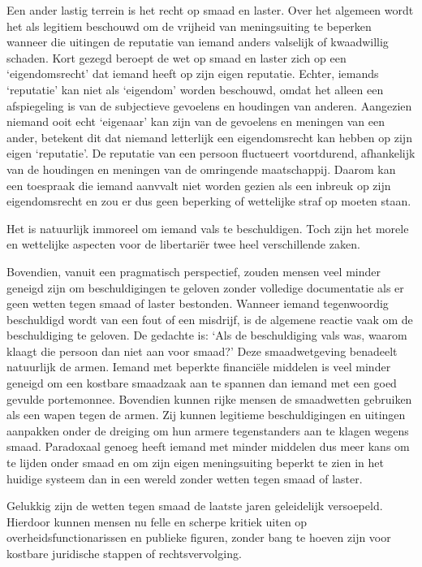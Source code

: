 \documentclass[
  a5paper,
  smalldemyvopaper,10pt,twoside,onecolumn,openright,extrafontsizes,hidelinks]{memoir}
\begin{document}
Een ander lastig terrein is het recht op smaad en laster. Over het
algemeen wordt het als legitiem beschouwd om de vrijheid van
meningsuiting te beperken wanneer die uitingen de reputatie van iemand
anders valselijk of kwaadwillig schaden. Kort gezegd beroept de wet op
smaad en laster zich op een `eigendomsrecht' dat iemand heeft op zijn
eigen reputatie. Echter, iemands `reputatie' kan niet als `eigendom'
worden beschouwd, omdat het alleen een afspiegeling is van de
subjectieve gevoelens en houdingen van anderen. Aangezien niemand ooit
echt `eigenaar' kan zijn van de gevoelens en meningen van een ander,
betekent dit dat niemand letterlijk een eigendomsrecht kan hebben op
zijn eigen `reputatie'. De reputatie van een persoon fluctueert
voortdurend, afhankelijk van de houdingen en meningen van de omringende
maatschappij. Daarom kan een toespraak die iemand aanvvalt niet worden
gezien als een inbreuk op zijn eigendomsrecht en zou er dus geen
beperking of wettelijke straf op moeten staan.

Het is natuurlijk immoreel om iemand vals te beschuldigen. Toch zijn het
morele en wettelijke aspecten voor de libertariër twee heel
verschillende zaken.

Bovendien, vanuit een pragmatisch perspectief, zouden mensen veel minder
geneigd zijn om beschuldigingen te geloven zonder volledige documentatie
als er geen wetten tegen smaad of laster bestonden. Wanneer iemand
tegenwoordig beschuldigd wordt van een fout of een misdrijf, is de
algemene reactie vaak om de beschuldiging te geloven. De gedachte is:
`Als de beschuldiging vals was, waarom klaagt die persoon dan niet aan
voor smaad?' Deze smaadwetgeving benadeelt natuurlijk de armen. Iemand
met beperkte financiële middelen is veel minder geneigd om een kostbare
smaadzaak aan te spannen dan iemand met een goed gevulde portemonnee.
Bovendien kunnen rijke mensen de smaadwetten gebruiken als een wapen
tegen de armen. Zij kunnen legitieme beschuldigingen en uitingen
aanpakken onder de dreiging om hun armere tegenstanders aan te klagen
wegens smaad. Paradoxaal genoeg heeft iemand met minder middelen dus
meer kans om te lijden onder smaad en om zijn eigen meningsuiting
beperkt te zien in het huidige systeem dan in een wereld zonder wetten
tegen smaad of laster.

Gelukkig zijn de wetten tegen smaad de laatste jaren geleidelijk
versoepeld. Hierdoor kunnen mensen nu felle en scherpe kritiek uiten op
overheidsfunctionarissen en publieke figuren, zonder bang te hoeven zijn
voor kostbare juridische stappen of rechtsvervolging.
\end{document}
